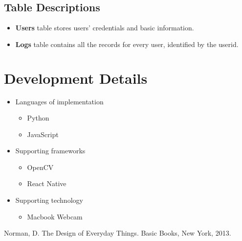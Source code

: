 \documentclass{article}
\begin{document}
\subsection{Table Descriptions}
\begin{itemize}
    \item \textbf{Users} table stores users' credentials and basic information.
    \item \textbf{Logs} table contains all the records for every user, identified by the userid.
\end{itemize}

\section{Development Details}
\begin{itemize}
    \item Languages of implementation
    \begin{itemize}
        \item Python
        \item JavaScript
    \end{itemize}
    \item Supporting frameworks
    \begin{itemize}
        \item OpenCV
        \item React Native
    \end{itemize}
    \item Supporting technology
    \begin{itemize}
        \item Macbook Webcam
    \end{itemize}
\end{itemize}


\begin{thebibliography}{9}
Norman, D. The Design of Everyday Things. Basic
Books, New York, 2013.
\end{thebibliography}


\end{document}
